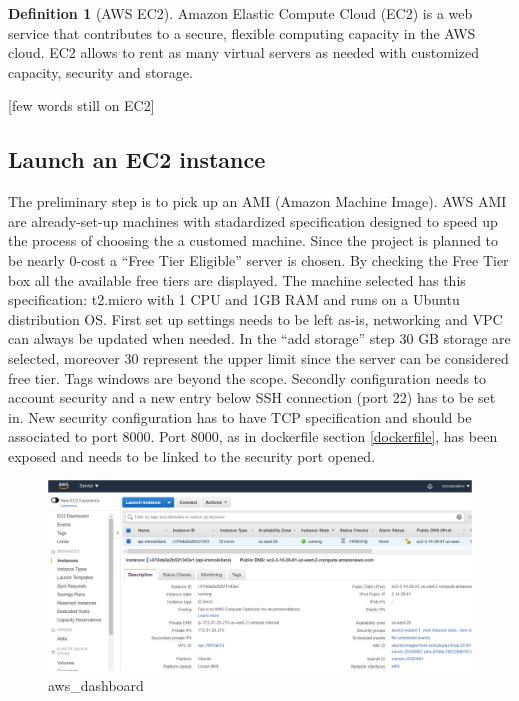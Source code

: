 \documentclass[
  12pt,
  a4paper,
  oneside]{book}
\theoremstyle{definition}
\newtheorem{definition}{Definition}[chapter]
\theoremstyle{definition}
\theoremstyle{definition}
\theoremstyle{remark}
\begin{document}
\begin{definition}[AWS EC2]
\protect\hypertarget{def:aws}{}{\label{def:aws} {} }Amazon Elastic Compute Cloud (EC2) is a web service that contributes to a secure, flexible computing capacity in the AWS cloud. EC2 allows to rent as many virtual servers as needed with customized capacity, security and storage.
\end{definition}

{[}few words still on EC2{]}

\hypertarget{launch-an-ec2-instance}{%
\subsection{Launch an EC2 instance}\label{launch-an-ec2-instance}}

The preliminary step is to pick up an AMI (Amazon Machine Image). AWS AMI are already-set-up machines with stadardized specification designed to speed up the process of choosing the a customed machine. Since the project is planned to be nearly 0-cost a ``Free Tier Eligible'' server is chosen. By checking the Free Tier box all the available free tiers are displayed. The machine selected has this specification: t2.micro with 1 CPU and 1GB RAM and runs on a Ubuntu distribution OS. First set up settings needs to be left as-is, networking and VPC can always be updated when needed. In the ``add storage'' step 30 GB storage are selected, moreover 30 represent the upper limit since the server can be considered free tier. Tags windows are beyond the scope. Secondly configuration needs to account security and a new entry below SSH connection (port 22) has to be set in. New security configuration has to have TCP specification and should be associated to port 8000. Port 8000, as in dockerfile section \ref{dockerfile}, has been exposed and needs to be linked to the security port opened.

\begin{figure}
\centering
\includegraphics{images/aws.PNG}
\caption{aws\_dashboard}
\end{figure}
\end{document}
